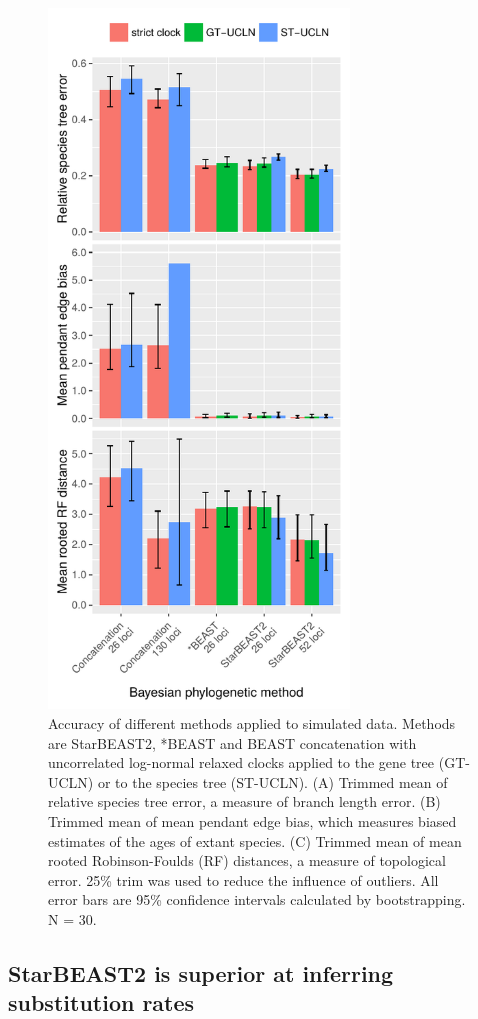 \documentclass[nogrid]{MBE}%
\begin{document}
\begin{figure}[htb!]
\centering
\includegraphics[width=80mm]{tree_error.pdf}
\caption
{Accuracy of different methods applied to simulated data. Methods are StarBEAST2,
*BEAST and BEAST concatenation with uncorrelated log-normal relaxed clocks applied
to the gene tree (GT-UCLN) or to the species tree (ST-UCLN). (A) Trimmed mean of
relative species tree error, a measure of branch length error. (B) Trimmed
mean of mean pendant edge bias, which measures biased estimates of the ages of
extant species. (C) Trimmed mean of mean rooted Robinson-Foulds (RF) distances, a
measure of topological error. 25\% trim was used to reduce the
influence of outliers. All error bars are 95\% confidence intervals calculated
by bootstrapping. N = 30.}
\label{fig:speciesTreeError}
\end{figure}

\subsection{StarBEAST2 is superior at inferring substitution rates}
\end{document}
